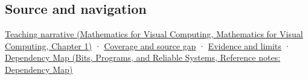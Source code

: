 \subsection{Source and navigation}\label{appendix-f77eadcc4a93-source-and-navigation}

\href{../02-Mathematics-for-Visual-Computing/main.pdf\#nameddest=01-foundations-i-ch017-rotation-first-becomes-understandable-in-a-plane}{Teaching narrative (Mathematics for Visual Computing, Mathematics for Visual Computing, Chapter 1)} · \hyperref[appendix-fd090d982a15-phase-6---parts-501-600]{Coverage and source gap} · \hyperref[appendix-a103e7846d21-phase-6---source-analysis-and-verification]{Evidence and limits} · \href{../01-Bits-Programs-and-Reliable-Systems/main.pdf\#nameddest=appendix-4ad47bdd269a}{Dependency Map (Bits, Programs, and Reliable Systems, Reference notes: Dependency Map)}

